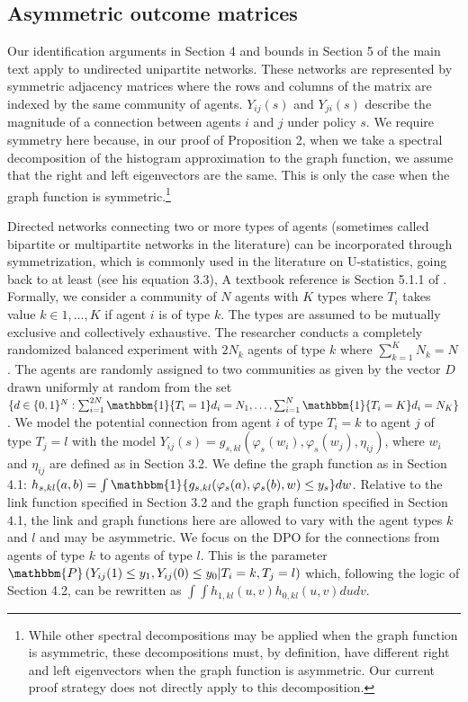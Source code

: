 \documentclass[12pt]{article}
\theoremstyle{definition}
\begin{document}
\subsection{Asymmetric outcome matrices}
Our identification arguments in Section 4 and bounds in Section 5 of the main text apply to undirected unipartite networks. These networks are represented by symmetric adjacency matrices where the rows and columns of the matrix are indexed by the same community of agents. $Y_{ij}(s)$  and $Y_{ji}(s)$ describe the magnitude of a connection between agents $i$ and $j$ under policy $s$. We require symmetry here because, in our proof of Proposition 2, when we take a spectral decomposition of the histogram approximation to the graph function, we assume that the right and left eigenvectors are the same. This is only the case when the graph function is symmetric.\footnote{While other spectral decompositions may be applied when the graph function is asymmetric, these decompositions must, by definition, have different right and left eigenvectors when the graph function is asymmetric. Our current proof strategy does not directly apply to this decomposition.} 

Directed networks connecting two or more types of agents (sometimes called bipartite or multipartite networks in the literature) can be incorporated through symmetrization, which is commonly used in the literature on U-statistics, going back to at least \cite{hoeffding1948class} (see his equation 3.3), A textbook reference is Section 5.1.1 of \cite{serfling2009approximation}. Formally, we consider a community of $N$ agents with $K$ types where $T_{i}$ takes value $k \in 1,\ldots,K$ if agent $i$ is of type $k$. The types are assumed to be mutually exclusive and collectively exhaustive. The researcher conducts a completely randomized balanced experiment with $2N_k$ agents of type $k$ where $\sum_{k=1}^{K}N_k = N$. The agents are randomly assigned to two communities as given by the vector $D$ drawn uniformly at random from the set $\{d \in \{0,1\}^N: \sum_{i=1}^{2N}\mathbbm{1}\{T_i = 1\}d_i = N_1,\ldots, \sum_{i=1}^{N}\mathbbm{1}\{T_i = K\}d_i = N_K\}$. We model the potential connection from agent $i$ of type $T_i = k$ to agent $j$ of type $T_j = l$ with the model $Y_{ij}(s) = g_{s,kl}(\varphi_s(w_i),\varphi_s(w_j),\eta_{ij})$, where $w_i$ and $\eta_{ij}$ are defined as in Section 3.2. We define the graph function as in Section 4.1: $h_{s,kl}(a,b) = \int\mathbbm{1}\{g_{s,kl}(\varphi_s(a),\varphi_s(b),w) \leq y_s\}dw$. Relative to the link function specified in Section 3.2 and the graph function specified in Section 4.1, the link and graph functions here are allowed to vary with the agent types $k$ and $l$ and may be asymmetric. We focus on the DPO for the connections from agents of type $k$ to agents of type $l$. This is the parameter $\mathbbm{P}\left(Y_{ij}(1) \leq y_1, Y_{ij}(0) \leq y_0 | T_i = k, T_j = l\right)$ which, following the logic of Section 4.2, can be rewritten as $\int\int h_{1,kl}(u,v)h_{0,kl}(u,v)dudv$.  
\end{document}
